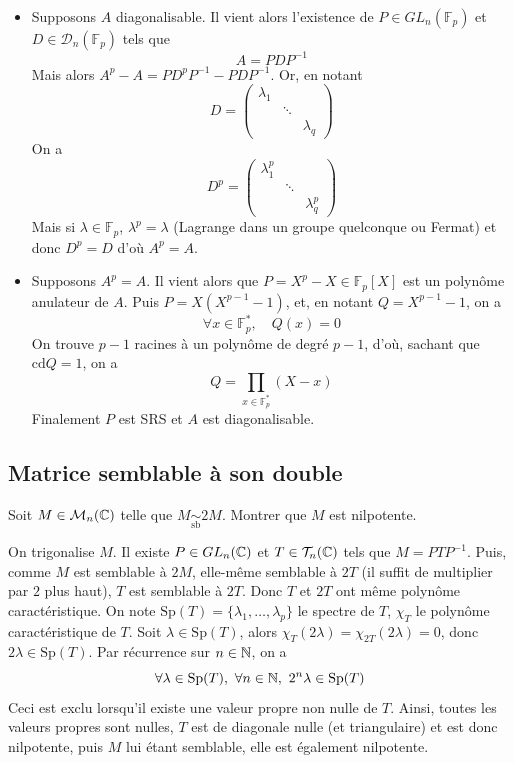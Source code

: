 \begin{sol}
	\begin{itemize}
		\item[$\boxed{\Rightarrow}$] Supposons $A$ diagonalisable. Il vient alors l'existence de $P\in GL_n(\mathbb F_p)$ et $D\in \mathcal D_n(\mathbb F_p)$ tels que \[A=PDP^{-1}\]
		Mais alors $A^p-A=PD^pP^{-1}-PDP^{-1}$. Or, en notant 
		\[
		D = \begin{pmatrix}
			\lambda_1 & &\\
			& \ddots & \\
			& & \lambda_q
		\end{pmatrix}
		\]
		On a \[
		D^p=\begin{pmatrix}
			\lambda_1^p & &\\
			& \ddots & \\
			& & \lambda_q^p
		\end{pmatrix}
		\]
		Mais si $\lambda\in\mathbb F_p$, $\lambda^p=\lambda$ (Lagrange dans un groupe quelconque ou Fermat) et donc $D^p=D$ d'où $A^p=A$.
		\item[$\boxed{\Leftarrow}$] Supposons $A^p=A$. Il vient alors que $P=X^p-X\in\mathbb F_p[X]$ est un polynôme anulateur de $A$. Puis $P = X(X^{p-1}-1)$, et, en notant $Q=X^{p-1}-1$, on a \[\forall x\in\mathbb F_p^*,\quad Q(x)=0\]
		On trouve $p-1$ racines à un polynôme de degré $p-1$, d'où, sachant que $\text{cd}Q=1$, on a \[Q=\prod_{x\in\mathbb F_p^*}(X-x)\]
		Finalement $P$ est SRS et $A$ est diagonalisable.

	\end{itemize}
\end{sol}

\subsection{Matrice semblable à son double}
\begin{exo}
	 Soit $M\in\mathcal M_n(\mathbb{C})$ telle que $M\underset{\text{sb}}{\sim}2M$. Montrer que $M$ est nilpotente.
\end{exo}

\begin{sol}
	On trigonalise $M$. Il existe $P\in GL_n(\mathbb{C})$ et $T\in \mathcal T_n(\mathbb{C})$ tels que $M=PTP^{-1}$. Puis, comme $M$ est semblable à $2M$, elle-même semblable à $2T$ (il suffit de multiplier par $2$ plus haut), $T$ est semblable à $2T$. Donc $T$ et $2T$ ont même polynôme caractéristique. On note $\text{Sp}(T)=\lbrace \lambda_1,\dots,\lambda_p\rbrace$ le spectre de $T$, $\chi_T$ le polynôme caractéristique de $T$. Soit $\lambda\in \text{Sp}(T)$, alors $\chi_T(2\lambda)=\chi_{2T}(2\lambda)=0$, donc $2\lambda \in \text{Sp}(T)$. Par récurrence sur $n\in\mathbb{N}$, on a \[\forall \lambda \in \text{Sp}(T),\ \forall n\in\mathbb{N},\ 2^n\lambda\in\text{Sp}(T)\]
	Ceci est exclu lorsqu'il existe une valeur propre non nulle de $T$. Ainsi, toutes les valeurs propres sont nulles, $T$ est de diagonale nulle (et triangulaire) et est donc nilpotente, puis $M$ lui étant semblable, elle est également nilpotente.
\end{sol}

